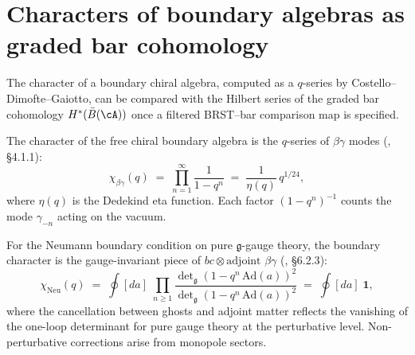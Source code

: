\section{Characters of boundary algebras as graded bar cohomology}
\label{subsec:boundary-characters-bar}

\providecommand{\Gr}{\operatorname{Gr}}

The character of a boundary chiral algebra, computed as a $q$-series
by Costello--Dimofte--Gaiotto, can be compared with the Hilbert series
of the graded bar cohomology $H^*(\bar{B}(\cA))$ once a filtered
BRST--bar comparison map is specified.

\begin{definition}
\label{def:free-chiral-boundary-character}
The character of the free chiral boundary algebra is the $q$-series
of $\beta\gamma$ modes \textup{(}\!\cite{CDG20}, \S4.1.1\textup{)}:
\begin{equation}\label{eq:free-chiral-character}
\chi_{\beta\gamma}(q)
\;=\;
\prod_{n=1}^{\infty} \frac{1}{1 - q^n}
\;=\;
\frac{1}{\eta(q)}\,q^{1/24},
\end{equation}
where $\eta(q)$ is the Dedekind eta function. Each factor
$(1-q^n)^{-1}$ counts the mode $\gamma_{-n}$ acting on the vacuum.
\end{definition}

\begin{proposition}
\label{prop:neumann-character}
For the Neumann boundary condition on pure $\mathfrak{g}$-gauge theory,
the boundary character is the gauge-invariant piece of $bc \otimes
\text{adjoint } \beta\gamma$ \textup{(}\!\cite{CDG20}, \S6.2.3\textup{)}:
\begin{equation}\label{eq:neumann-character}
\chi_{\mathrm{Neu}}(q)
\;=\;
\oint [da]\;
\prod_{n \geq 1}
\frac{\det\nolimits_{\mathfrak{g}}(1 - q^n\,\mathrm{Ad}(a))^2}
 {\det\nolimits_{\mathfrak{g}}(1 - q^n\,\mathrm{Ad}(a))^2}
\;=\;
\oint [da]\;\mathbf{1},
\end{equation}
where the cancellation between ghosts and adjoint matter reflects
the vanishing of the one-loop determinant for pure gauge theory
at the perturbative level. Non-perturbative corrections arise from
monopole sectors.
\end{proposition}

